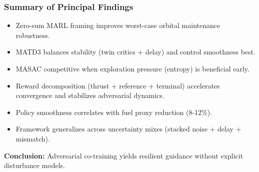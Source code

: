 \begin{frame}
  \frametitle{Summary of Principal Findings}
  \small
  \begin{itemize}\setlength{\itemsep}{5pt}
    \item Zero-sum MARL framing improves worst-case orbital maintenance robustness.
    \item MATD3 balances stability (twin critics + delay) and control smoothness best.
    \item MASAC competitive when exploration pressure (entropy) is beneficial early.
    \item Reward decomposition (thrust + reference + terminal) accelerates convergence and stabilizes adversarial dynamics.
    \item Policy smoothness correlates with fuel proxy reduction (8-12\%).
    \item Framework generalizes across uncertainty mixes (stacked noise + delay + mismatch).
  \end{itemize}
  \vspace{4pt}
  \textbf{Conclusion:} Adversarial co-training yields resilient guidance without explicit disturbance models.
\end{frame}







